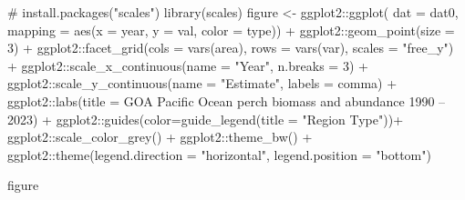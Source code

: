 \documentclass[
  letterpaper,
  oneside,
  open=any]{scrbook}
\newenvironment{Shaded}{\begin{snugshade}}{\end{snugshade}}
\newcommand{\AttributeTok}[1]{\textcolor[rgb]{0.40,0.45,0.13}{#1}}
\newcommand{\CommentTok}[1]{\textcolor[rgb]{0.37,0.37,0.37}{#1}}
\newcommand{\DecValTok}[1]{\textcolor[rgb]{0.68,0.00,0.00}{#1}}
\newcommand{\FunctionTok}[1]{\textcolor[rgb]{0.28,0.35,0.67}{#1}}
\newcommand{\NormalTok}[1]{\textcolor[rgb]{0.00,0.23,0.31}{#1}}
\newcommand{\OtherTok}[1]{\textcolor[rgb]{0.00,0.23,0.31}{#1}}
\newcommand{\SpecialCharTok}[1]{\textcolor[rgb]{0.37,0.37,0.37}{#1}}
\newcommand{\StringTok}[1]{\textcolor[rgb]{0.13,0.47,0.30}{#1}}
\begin{document}
\begin{Shaded}
\begin{Highlighting}[]
\CommentTok{\# install.packages("scales")}
\FunctionTok{library}\NormalTok{(scales)}
\NormalTok{figure }\OtherTok{\textless{}{-}}\NormalTok{ ggplot2}\SpecialCharTok{::}\FunctionTok{ggplot}\NormalTok{(}
  \AttributeTok{dat =}\NormalTok{ dat0, }
  \AttributeTok{mapping =} \FunctionTok{aes}\NormalTok{(}\AttributeTok{x =}\NormalTok{ year, }\AttributeTok{y =}\NormalTok{ val, }\AttributeTok{color =}\NormalTok{ type)) }\SpecialCharTok{+}
\NormalTok{  ggplot2}\SpecialCharTok{::}\FunctionTok{geom\_point}\NormalTok{(}\AttributeTok{size =} \DecValTok{3}\NormalTok{) }\SpecialCharTok{+} 
\NormalTok{  ggplot2}\SpecialCharTok{::}\FunctionTok{facet\_grid}\NormalTok{(}\AttributeTok{cols =} \FunctionTok{vars}\NormalTok{(area), }\AttributeTok{rows =} \FunctionTok{vars}\NormalTok{(var), }\AttributeTok{scales =} \StringTok{"free\_y"}\NormalTok{) }\SpecialCharTok{+} 
\NormalTok{  ggplot2}\SpecialCharTok{::}\FunctionTok{scale\_x\_continuous}\NormalTok{(}\AttributeTok{name =} \StringTok{"Year"}\NormalTok{, }\AttributeTok{n.breaks =} \DecValTok{3}\NormalTok{) }\SpecialCharTok{+}
\NormalTok{  ggplot2}\SpecialCharTok{::}\FunctionTok{scale\_y\_continuous}\NormalTok{(}\AttributeTok{name =} \StringTok{"Estimate"}\NormalTok{, }\AttributeTok{labels =}\NormalTok{ comma) }\SpecialCharTok{+}
\NormalTok{  ggplot2}\SpecialCharTok{::}\FunctionTok{labs}\NormalTok{(}\AttributeTok{title =} \StringTok{\textquotesingle{}GOA Pacific Ocean perch biomass and abundance 1990 – 2023\textquotesingle{}}\NormalTok{)  }\SpecialCharTok{+} 
\NormalTok{  ggplot2}\SpecialCharTok{::}\FunctionTok{guides}\NormalTok{(}\AttributeTok{color=}\FunctionTok{guide\_legend}\NormalTok{(}\AttributeTok{title =} \StringTok{"Region Type"}\NormalTok{))}\SpecialCharTok{+}
\NormalTok{  ggplot2}\SpecialCharTok{::}\FunctionTok{scale\_color\_grey}\NormalTok{() }\SpecialCharTok{+}
\NormalTok{  ggplot2}\SpecialCharTok{::}\FunctionTok{theme\_bw}\NormalTok{() }\SpecialCharTok{+}
\NormalTok{  ggplot2}\SpecialCharTok{::}\FunctionTok{theme}\NormalTok{(}\AttributeTok{legend.direction =} \StringTok{"horizontal"}\NormalTok{, }
                 \AttributeTok{legend.position =} \StringTok{"bottom"}\NormalTok{)}

\NormalTok{figure}
\end{Highlighting}
\end{Shaded}
\end{document}
